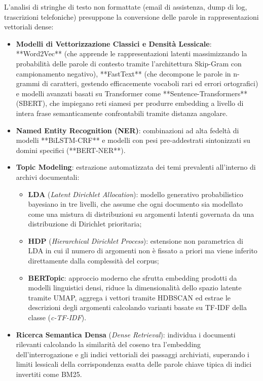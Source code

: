 \documentclass[11pt, a4paper]{article}
\begin{document}
L'analisi di stringhe di testo non formattate (email di assistenza, dump di log, trascrizioni telefoniche) presuppone la conversione delle parole in rappresentazioni vettoriali dense:
\begin{itemize}
    \item \textbf{Modelli di Vettorizzazione Classici e Densità Lessicale}: **Word2Vec** (che apprende le rappresentazioni latenti massimizzando la probabilità delle parole di contesto tramite l'architettura Skip-Gram con campionamento negativo), **FastText** (che decompone le parole in n-grammi di caratteri, gestendo efficacemente vocaboli rari ed errori ortografici) e modelli avanzati basati su Transformer come **Sentence-Transformers** (SBERT), che impiegano reti siamesi per produrre embedding a livello di intera frase semanticamente confrontabili tramite distanza angolare.
    \item \textbf{Named Entity Recognition (NER)}: combinazioni ad alta fedeltà di modelli **BiLSTM-CRF** e modelli con pesi pre-addestrati sintonizzati su domini specifici (**BERT-NER**).
    \item \textbf{Topic Modeling}: estrazione automatizzata dei temi prevalenti all'interno di archivi documentali:
    \begin{itemize}
        \item \textbf{LDA} (\emph{Latent Dirichlet Allocation}): modello generativo probabilistico bayesiano in tre livelli, che assume che ogni documento sia modellato come una mistura di distribuzioni su argomenti latenti governata da una distribuzione di Dirichlet prioritaria;
        \item \textbf{HDP} (\emph{Hierarchical Dirichlet Process}): estensione non parametrica di LDA in cui il numero di argomenti non è fissato a priori ma viene inferito direttamente dalla complessità del corpus;
        \item \textbf{BERTopic}: approccio moderno che sfrutta embedding prodotti da modelli linguistici densi, riduce la dimensionalità dello spazio latente tramite UMAP, aggrega i vettori tramite HDBSCAN ed estrae le descrizioni degli argomenti calcolando varianti basate su TF-IDF della classe (\emph{c-TF-IDF}).
    \end{itemize}
    \item \textbf{Ricerca Semantica Densa} (\emph{Dense Retrieval}): individua i documenti rilevanti calcolando la similarità del coseno tra l'embedding dell'interrogazione e gli indici vettoriali dei passaggi archiviati, superando i limiti lessicali della corrispondenza esatta delle parole chiave tipica di indici invertiti come BM25.
\end{itemize}
\end{document}
